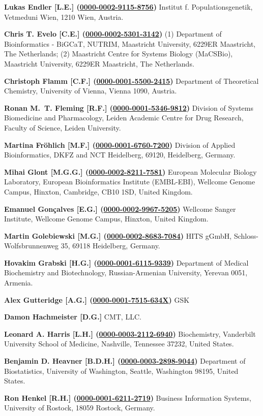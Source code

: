 \documentclass{sbml-paper}
\newcommand{\orcid}[1]{\href{https://orcid.org/#1}{#1}}
\begin{document}
\textbf{Lukas Endler [L.E.] (\orcid{0000-0002-9115-8756})} Institut f. Populationsgenetik, Vetmeduni  Wien, 1210 Wien, Austria.

\textbf{Chris T. Evelo [C.E.] (\orcid{0000-0002-5301-3142})} (1) Department of Bioinformatics - BiGCaT, NUTRIM, Maastricht University, 6229ER Maastricht, The Netherlands; (2) Maastricht Centre for Systems Biology (MaCSBio), Maastricht University, 6229ER Maastricht, The Netherlands.

\textbf{Christoph Flamm [C.F.] (\orcid{0000-0001-5500-2415})} Department of Theoretical Chemistry, University of Vienna, Vienna 1090, Austria.

\textbf{Ronan M.~T. Fleming [R.F.] (\orcid{0000-0001-5346-9812})} Division of Systems Biomedicine and Pharmacology, Leiden Academic Centre for Drug Research, Faculty of Science, Leiden University.

\textbf{Martina Fröhlich [M.F.] (\orcid{0000-0001-6760-7200})} Division of Applied Bioinformatics, DKFZ and NCT Heidelberg, 69120, Heidelberg, Germany.

\textbf{Mihai Glont [M.G.G.] (\orcid{0000-0002-8211-7581})} European Molecular Biology Laboratory, European Bioinformatics Institute (EMBL-EBI), Wellcome Genome Campus, Hinxton, Cambridge, CB10 1SD, United Kingdom.

\textbf{Emanuel Gonçalves [E.G.] (\orcid{0000-0002-9967-5205})} Wellcome Sanger Institute, Wellcome Genome Campus, Hinxton, United Kingdom.

\textbf{Martin Golebiewski [M.G.] (\orcid{0000-0002-8683-7084})} HITS gGmbH, Schloss-Wolfsbrunnenweg 35, 69118 Heidelberg, Germany.

\textbf{Hovakim Grabski [H.G.] (\orcid{0000-0001-6115-9339})} Department of Medical Biochemistry and Biotechnology, Russian-Armenian University, Yerevan 0051, Armenia.

\textbf{Alex Gutteridge [A.G.] (\orcid{0000-0001-7515-634X})} GSK

\textbf{Damon Hachmeister [D.G.]} CMT, LLC.

\textbf{Leonard A. Harris [L.H.] (\orcid{0000-0003-2112-6940})} Biochemistry, Vanderbilt University School of Medicine, Nashville, Tennessee 37232, United States.

\textbf{Benjamin D. Heavner [B.D.H.] (\orcid{0000-0003-2898-9044})} Department of Biostatistics, University of Washington, Seattle, Washington 98195, United States.

\textbf{Ron Henkel [R.H.] (\orcid{0000-0001-6211-2719})} Business Information Systems, University of Rostock, 18059 Rostock, Germany.
\end{document}
